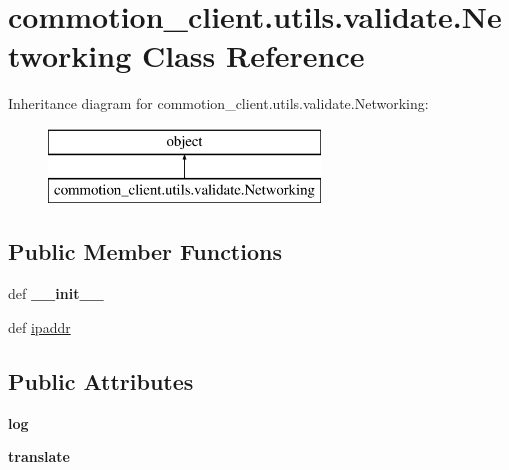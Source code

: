 \hypertarget{classcommotion__client_1_1utils_1_1validate_1_1Networking}{\section{commotion\-\_\-client.\-utils.\-validate.\-Networking Class Reference}
\label{classcommotion__client_1_1utils_1_1validate_1_1Networking}
}
Inheritance diagram for commotion\-\_\-client.\-utils.\-validate.\-Networking\-:\begin{figure}[H]
\begin{center}
\leavevmode
\includegraphics[height=2.000000cm]{classcommotion__client_1_1utils_1_1validate_1_1Networking}
\end{center}
\end{figure}
\subsection*{Public Member Functions}
\begin{DoxyCompactItemize}
\item 
\hypertarget{classcommotion__client_1_1utils_1_1validate_1_1Networking_af83f8af7dc9fd426c27d7fd214051edc}{def {\bfseries \-\_\-\-\_\-init\-\_\-\-\_\-}}\label{classcommotion__client_1_1utils_1_1validate_1_1Networking_af83f8af7dc9fd426c27d7fd214051edc}

\item 
def \hyperlink{classcommotion__client_1_1utils_1_1validate_1_1Networking_aaeee5dedbe589a997ddf820b17359c35}{ipaddr}
\end{DoxyCompactItemize}
\subsection*{Public Attributes}
\begin{DoxyCompactItemize}
\item 
\hypertarget{classcommotion__client_1_1utils_1_1validate_1_1Networking_af284adbbe8265ea379d64d3d6ee66342}{{\bfseries log}}\label{classcommotion__client_1_1utils_1_1validate_1_1Networking_af284adbbe8265ea379d64d3d6ee66342}

\item 
\hypertarget{classcommotion__client_1_1utils_1_1validate_1_1Networking_a2728d53728c499c4da34412a8b773216}{{\bfseries translate}}\label{classcommotion__client_1_1utils_1_1validate_1_1Networking_a2728d53728c499c4da34412a8b773216}

\end{DoxyCompactItemize}


